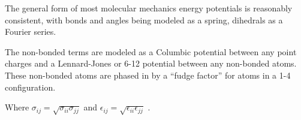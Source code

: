 The general form of most molecular mechanics energy potentials is reasonably consistent, with bonds and angles being modeled as a spring, dihedrals as a Fourier series.




The non-bonded terms are modeled as a Columbic potential between any point charges and a Lennard-Jones or 6-12 potential between any non-bonded atoms.
These non-bonded atoms are phased in by a ``fudge factor'' for atoms in a 1-4 configuration.

Where $\sigma_{ij} = \sqrt{\sigma_{ii} \sigma_{jj}}$ and $\epsilon_{ij} = \sqrt{\epsilon_{ii}\epsilon_{jj}}$ \cite{jorgensen1996development}.
